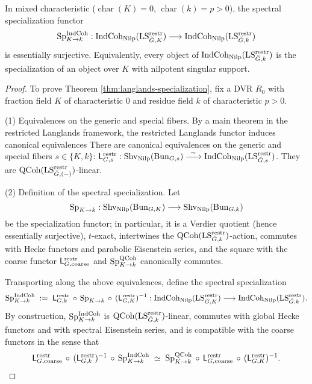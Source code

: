 \begin{theorem}\label{thm:langlands-specialization}
In mixed characteristic (\(\operatorname{char}(K)=0\), \(\operatorname{char}(k)=p>0\)), the spectral specialization functor
\[
\operatorname{Sp}^{\mathrm{IndCoh}}_{K\to k}:
\mathrm{IndCoh}_{\mathrm{Nilp}}(\mathrm{LS}^{\mathrm{restr}}_{\breve G,K})\longrightarrow\mathrm{IndCoh}_{\mathrm{Nilp}}(\mathrm{LS}^{\mathrm{restr}}_{\breve G,k})
\]
is essentially surjective. Equivalently, every object of \(\mathrm{IndCoh}_{\mathrm{Nilp}}(\mathrm{LS}^{\mathrm{restr}}_{\breve G,k})\) is the specialization of an object over \(K\) with nilpotent singular support.
\end{theorem}

\begin{proof}
To prove Theorem \ref{thm:langlands-specialization}, fix a DVR \(R_0\) with fraction field \(K\) of characteristic \(0\) and residue field \(k\) of characteristic \(p>0\).

(1) Equivalences on the generic and special fibers. By a main theorem in the restricted Langlands framework, the restricted Langlands functor induces canonical equivalences
There are canonical equivalences on the generic and special fibers $s\in\{K,k\}$:
\(\mathsf L^{\restr}_{G,s}:\Shv_{\Nilp}(\Bun_{G,s})\xrightarrow{\ \sim\ }\IndCoh_{\Nilp}(\LS^{\restr}_{\breve G,s})\).
They are \(\mathrm{QCoh}(\mathrm{LS}^{\mathrm{restr}}_{\breve G,(-)})\)-linear.

(2) Definition of the spectral specialization. Let
\[
\operatorname{Sp}_{K\to k}:\mathrm{Shv}_{\mathrm{Nilp}}(\mathrm{Bun}_{G,K})\longrightarrow\mathrm{Shv}_{\mathrm{Nilp}}(\mathrm{Bun}_{G,k})
\]
be the specialization functor; in particular, it is a Verdier quotient (hence essentially surjective), \(t\)-exact, intertwines the \(\mathrm{QCoh}(\mathrm{LS}^{\mathrm{restr}}_{\breve G,k})\)-action, commutes with Hecke functors and parabolic Eisenstein series, and the square with the coarse functor \(\mathsf L^{\mathrm{restr}}_{G,\mathrm{coarse}}\) and \(\operatorname{Sp}^{\mathrm{QCoh}}_{K\to k}\) canonically commutes.

Transporting along the above equivalences, define the spectral specialization
\[
\operatorname{Sp}^{\mathrm{IndCoh}}_{K\to k}
\;:=\;
\mathsf L^{\mathrm{restr}}_{G,k}\mathrel{\mkern2mu\circ\mkern2mu}\allowbreak\operatorname{Sp}_{K\to k}\mathrel{\mkern2mu\circ\mkern2mu}\allowbreak(\mathsf L^{\mathrm{restr}}_{G,K})^{-1}
:\mathrm{IndCoh}_{\mathrm{Nilp}}(\mathrm{LS}^{\mathrm{restr}}_{\breve G,K})\longrightarrow\mathrm{IndCoh}_{\mathrm{Nilp}}(\mathrm{LS}^{\mathrm{restr}}_{\breve G,k}).
\]
By construction, \(\operatorname{Sp}^{\mathrm{IndCoh}}_{K\to k}\) is \(\mathrm{QCoh}(\mathrm{LS}^{\mathrm{restr}}_{\breve G,k})\)-linear, commutes with global Hecke functors and with spectral Eisenstein series, and is compatible with the coarse functors in the sense that
\[
\mathsf L^{\mathrm{restr}}_{G,\mathrm{coarse}}\mathrel{\mkern2mu\circ\mkern2mu}\allowbreak (\mathsf L^{\mathrm{restr}}_{G,k})^{-1}\mathrel{\mkern2mu\circ\mkern2mu}\allowbreak\operatorname{Sp}^{\mathrm{IndCoh}}_{K\to k}
\;\simeq\;
\operatorname{Sp}^{\mathrm{QCoh}}_{K\to k}\mathrel{\mkern2mu\circ\mkern2mu}\allowbreak\mathsf L^{\mathrm{restr}}_{G,\mathrm{coarse}}\mathrel{\mkern2mu\circ\mkern2mu}\allowbreak (\mathsf L^{\mathrm{restr}}_{G,K})^{-1}.
\]


\end{proof}
